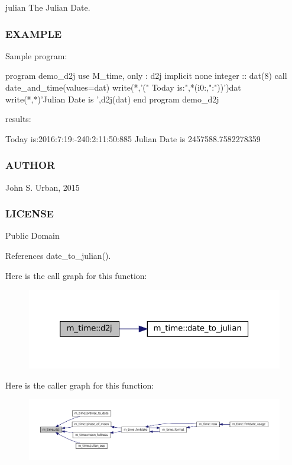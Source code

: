 julian The Julian Date.

\subsubsection*{E\+X\+A\+M\+P\+LE}

\begin{DoxyVerb}Sample program:

 program demo_d2j
 use M_time, only : d2j
 implicit none
 integer :: dat(8)
    call date_and_time(values=dat)
    write(*,'(" Today is:",*(i0:,":"))')dat
    write(*,*)'Julian Date is ',d2j(dat)
 end program demo_d2j

results:

 Today is:2016:7:19:-240:2:11:50:885
 Julian Date is    2457588.7582278359
\end{DoxyVerb}


\subsubsection*{A\+U\+T\+H\+OR}

John S. Urban, 2015 \subsubsection*{L\+I\+C\+E\+N\+SE}

Public Domain 

References date\+\_\+to\+\_\+julian().

Here is the call graph for this function\+:\nopagebreak
\begin{figure}[H]
\begin{center}
\leavevmode
\includegraphics[width=320pt]{namespacem__time_a3fccc53c2650104eff084c7998d18f54_cgraph}
\end{center}
\end{figure}
Here is the caller graph for this function\+:\nopagebreak
\begin{figure}[H]
\begin{center}
\leavevmode
\includegraphics[width=350pt]{namespacem__time_a3fccc53c2650104eff084c7998d18f54_icgraph}
\end{center}
\end{figure}
\mbox{\label{namespacem__time_a727dd77bbd4a5d0e3947c5d303845947}} 
